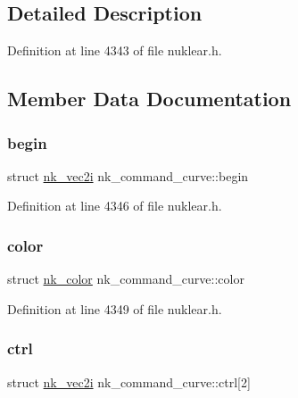 \subsection{Detailed Description}


Definition at line 4343 of file nuklear.\+h.



\subsection{Member Data Documentation}
\mbox{\label{structnk__command__curve_ac90ce7358b1ed8d529d2cbaec92c2fd7}} 
\subsubsection{\texorpdfstring{begin}{begin}}
{\footnotesize\ttfamily struct \mbox{\hyperlink{structnk__vec2i}{nk\+\_\+vec2i}} nk\+\_\+command\+\_\+curve\+::begin}



Definition at line 4346 of file nuklear.\+h.

\mbox{\label{structnk__command__curve_a9e3bd7fb76b0ca7be0fd1a215bf28858}} 
\subsubsection{\texorpdfstring{color}{color}}
{\footnotesize\ttfamily struct \mbox{\hyperlink{structnk__color}{nk\+\_\+color}} nk\+\_\+command\+\_\+curve\+::color}



Definition at line 4349 of file nuklear.\+h.

\mbox{\label{structnk__command__curve_a237c28ec24d044902526a37ba721d325}} 
\subsubsection{\texorpdfstring{ctrl}{ctrl}}
{\footnotesize\ttfamily struct \mbox{\hyperlink{structnk__vec2i}{nk\+\_\+vec2i}} nk\+\_\+command\+\_\+curve\+::ctrl\mbox{[}2\mbox{]}}



